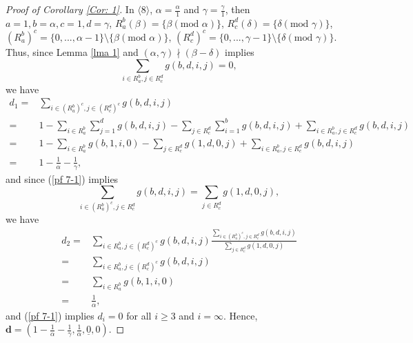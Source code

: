 \documentclass{amsart}
\theoremstyle{definition}
\numberwithin{equation}{section}%
\begin{document}
\begin{proof}[Proof of Corollary \ref{Cor: 1}]
    In $\langle 8 \rangle$, $\alpha=\frac{\alpha}{1}$ and $\gamma=\frac{\gamma}{1}$, then $a=1, b=\alpha, c=1, d=\gamma$, $R_a^b(\beta)=\{ \beta (\mbox{mod } \alpha) \}$, $R_c^d(\delta)=\{ \delta (\mbox{mod } \gamma) \}$, $(R_a^b)^c=\{0, ..., \alpha-1\}\setminus\{ \beta (\mbox{mod } \alpha) \}$, $(R_c^d)^c=\{0, ..., \gamma-1\}\setminus\{ \delta (\mbox{mod } \gamma) \}$. Thus, since Lemma \ref{lma 1} and $(\alpha,\gamma)\nmid (\beta-\delta)$ implies 
    \begin{equation}\label{pf 7-1}
        \sum_{i\in R_a^b, j\in R_c^d}g(b,d,i,j)=0,
    \end{equation}
    we have 
    \begin{align*}
        d_1=&\sum_{i\in (R_a^b)^c, j\in (R_c^d)^c}g(b,d,i,j)\\
        =&1-\sum_{i\in R_a^b}\sum_{j=1}^d g(b,d,i,j)-\sum_{j\in R_c^d}\sum_{i=1}^b g(b,d,i,j)+\sum_{i\in R_a^b, j\in R_c^d}g(b,d,i,j)\\
        =&1-\sum_{i\in R_a^b} g(b,1,i,0)-\sum_{j\in R_c^d} g(1,d,0,j)+\sum_{i\in R_a^b, j\in R_c^d}g(b,d,i,j)\\
        =& 1-\frac{1}{\alpha}-\frac{1}{\gamma},
    \end{align*}
    and since (\ref{pf 7-1}) implies 
    \[\sum_{i\in (R_a^b)^c, j\in R_c^d}g(b,d,i,j)=\sum_{j\in R_c^d}g(1,d,0,j),\]
    we have
    \begin{align*}
        d_2=&\sum_{i\in R_a^b, j\in (R_c^d)^c}g(b,d,i,j) \frac{\sum_{i\in (R_a^b)^c, j\in R_c^d}g(b,d,i,j)}{\sum_{ j\in R_c^d}g(1,d,0,j)}\\
        =&\sum_{i\in R_a^b, j\in (R_c^d)^c}g(b,d,i,j) \\
        =&\sum_{i\in R_a^b}g(b,1,i,0)\\
        =&\frac{1}{\alpha},
    \end{align*}
    and (\ref{pf 7-1}) implies $d_i=0$ for all $i\geq 3$ and $i=\infty$. Hence, $\mathbf{d}=(1-\frac{1}{\alpha }-\frac{1}{\gamma },\frac{1}{\alpha },\underline{0},0)$. 
    

\end{proof}
\end{document}
